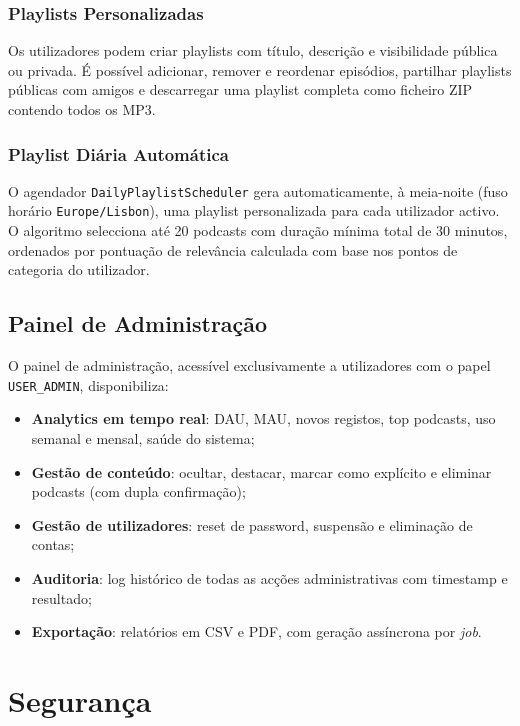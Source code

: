 \documentclass[12pt, a4paper]{report}
\begin{document}
\subsection{Playlists Personalizadas}

Os utilizadores podem criar playlists com título, descrição e visibilidade
pública ou privada. É possível adicionar, remover e reordenar episódios, partilhar
playlists públicas com amigos e descarregar uma playlist completa como ficheiro
ZIP contendo todos os MP3.

\subsection{Playlist Diária Automática}

O agendador \texttt{DailyPlaylistScheduler} gera automaticamente, à meia-noite
(fuso horário \texttt{Europe/Lisbon}), uma playlist personalizada para cada
utilizador activo. O algoritmo selecciona até 20 podcasts com duração mínima
total de 30 minutos, ordenados por pontuação de relevância calculada com base
nos pontos de categoria do utilizador.

\section{Painel de Administração}

O painel de administração, acessível exclusivamente a utilizadores com o papel
\texttt{USER\_ADMIN}, disponibiliza:

\begin{itemize}
  \item \textbf{Analytics em tempo real}: DAU, MAU, novos registos, top podcasts, uso semanal e mensal, saúde do sistema;
  \item \textbf{Gestão de conteúdo}: ocultar, destacar, marcar como explícito e eliminar podcasts (com dupla confirmação);
  \item \textbf{Gestão de utilizadores}: reset de password, suspensão e eliminação de contas;
  \item \textbf{Auditoria}: log histórico de todas as acções administrativas com timestamp e resultado;
  \item \textbf{Exportação}: relatórios em CSV e PDF, com geração assíncrona por \emph{job}.
\end{itemize}

\chapter{Segurança}
\label{chap:seguranca}
\end{document}
